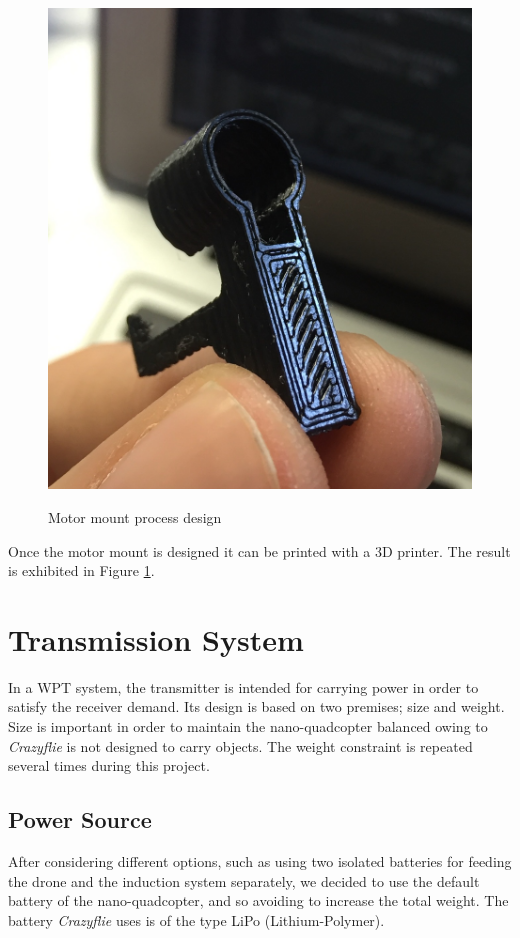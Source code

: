 \begin{figure}[H]
\begin{subfigmatrix}{3}
  {\includegraphics{./images/FullSizeRender}\label{F:finalMount}}
\end{subfigmatrix}
\caption{Motor mount process design}
\end{figure}

Once the motor mount is designed it can be printed with a 3D printer. The result is exhibited in Figure \ref{F:finalMount}.



  \section{Transmission System}

In a WPT system, the transmitter is intended for carrying power in order to satisfy the receiver demand. Its design is based on two premises; size and weight. Size is important in order to maintain the nano-quadcopter balanced owing to \textit{Crazyflie} is not designed to carry objects. The weight constraint is repeated several times during this project.


    \subsection{Power Source}
After considering different options, such as using two isolated batteries for feeding the drone and the induction system separately, we decided to use the default battery of the nano-quadcopter, and so avoiding to increase the total weight. The battery \textit{Crazyflie} uses is of the type LiPo (Lithium-Polymer).
    

